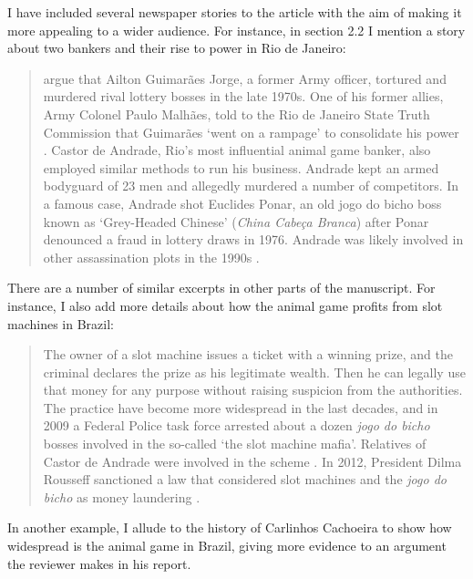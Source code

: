 \documentclass[a4paper,12pt]{article}
\begin{document}
\vspace{.25cm}

I have included several newspaper stories to the article with the aim of making it more appealing to a wider audience. For instance, in section 2.2 I mention a story about two bankers and their rise to power in Rio de Janeiro:

\begin{quote}
	\citet{jupiara2015poroes} argue that Ailton Guimarães Jorge, a former Army officer, tortured and murdered rival lottery bosses in the late 1970s. One of his former allies, Army Colonel Paulo Malhães, told to the Rio de Janeiro State Truth Commission that Guimarães `went on a rampage' to consolidate his power \citep{belem2015guimaraes}. Castor de Andrade, Rio's most influential animal game banker, also employed similar methods to run his business. Andrade kept an armed bodyguard of 23 men and allegedly murdered a number of competitors. In a famous case, Andrade shot Euclides Ponar, an old jogo do bicho boss known as `Grey-Headed Chinese' (\textit{China Cabeça Branca}) after Ponar denounced a fraud in lottery draws in 1976. Andrade was likely involved in other assassination plots in the 1990s \citep{globo2017castor}.
\end{quote}

There are a number of similar excerpts in other parts of the manuscript. For instance, I also add more details about how the animal game profits from slot machines in Brazil: 

\begin{quote}
	The owner of a slot machine issues a ticket with a winning prize, and the criminal declares the prize as his legitimate wealth. Then he can legally use that money for any purpose without raising suspicion from the authorities. The practice have become more widespread in the last decades, and in 2009 a Federal Police task force arrested about a dozen \textit{jogo do bicho} bosses involved in the so-called `the slot machine mafia'. Relatives of Castor de Andrade were involved in the scheme \citep{estado2011cacaniquel}. In 2012, President Dilma Rousseff sanctioned a law that considered slot machines and the \textit{jogo do bicho} as money laundering \citep{agenciabrasil2012dilma}.
\end{quote}

In another example, I allude to the history of Carlinhos Cachoeira to show how widespread is the animal game in Brazil, giving more evidence to an argument the reviewer makes in his report.
\end{document}
